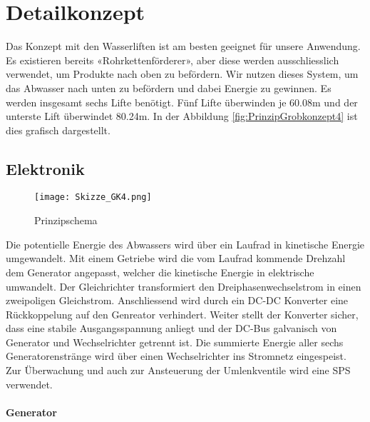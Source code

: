\section{Detailkonzept} \label{sec:detailkonzept}

Das Konzept mit den Wasserliften ist am besten geeignet für unsere Anwendung. Es existieren bereits «Rohrkettenförderer», aber diese werden ausschliesslich verwendet, um Produkte nach oben zu befördern. Wir nutzen dieses System, um das Abwasser nach unten zu befördern und dabei Energie zu gewinnen. Es werden insgesamt sechs Lifte benötigt. Fünf Lifte überwinden je 60.08\si{m} und der unterste Lift überwindet 80.24\si{m}. In der Abbildung \ref{fig:PrinzipGrobkonzept4}  ist dies grafisch dargestellt.

\subsection{Elektronik}

\begin{figure}[H]
\centering
\texttt{[image: Skizze\_GK4.png]}
\caption{Prinzipschema}
\label{fig:Prinzipschema}
\end{figure}

Die potentielle Energie des Abwassers wird über ein Laufrad in kinetische Energie umgewandelt. Mit einem Getriebe wird die vom Laufrad kommende Drehzahl dem Generator angepasst, welcher die kinetische Energie in elektrische umwandelt. Der Gleichrichter transformiert den Dreiphasenwechselstrom in einen zweipoligen Gleichstrom. Anschliessend wird durch ein DC-DC Konverter eine Rückkoppelung auf den Genreator verhindert. Weiter stellt der Konverter sicher, dass eine stabile Ausgangsspannung anliegt und der DC-Bus galvanisch von Generator und Wechselrichter getrennt ist. Die summierte Energie aller sechs Generatorenstränge wird über einen Wechselrichter ins Stromnetz eingespeist. Zur Überwachung und auch zur Ansteuerung der Umlenkventile wird eine SPS verwendet.

\bigskip

\paragraph{Generator} \label{para:generator}

